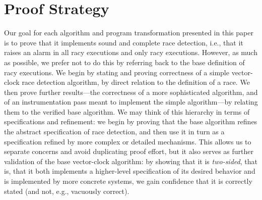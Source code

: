 \documentclass[preprint, 10pt]{sigplanconf}
\begin{document}
\section{Proof Strategy}
\label{strategy}
Our goal for each algorithm and program transformation presented in this paper is to prove that it implements sound and complete race detection, i.e., that it raises an alarm in all racy executions and only racy executions. However, as much as possible, we prefer not to do this by referring back to the base definition of racy executions. We begin by stating and proving correctness of a simple vector-clock race detection algorithm, by direct relation to the definition of a race. We then prove further results---the correctness of a more sophisticated algorithm, and of an instrumentation pass meant to implement the simple algorithm---by relating them to the verified base algorithm. We may think of this hierarchy in terms of specifications and refinement: we begin by proving that the base algorithm refines the abstract specification of race detection, and then use it in turn as a specification refined by more complex or detailed mechanisms. This allows us to separate concerns and avoid duplicating proof effort, but it also serves as further validation of the base vector-clock algorithm: by showing that it is \emph{two-sided}, that is, that it both implements a higher-level specification of its desired behavior and is implemented by more concrete systems, we gain confidence that it is correctly stated (and not, e.g., vacuously correct).
\end{document}
